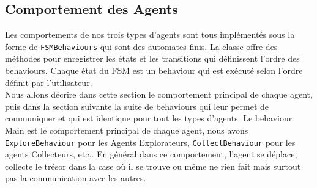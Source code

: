 \documentclass[10pt]{article}
\begin{document}
	\subsection{Comportement des Agents}
	Les comportements de nos trois types d'agents sont tous implémentés sous la forme de \texttt{FSMBehaviours} qui sont des automates finis. La classe offre des méthodes pour enregistrer les états et les transitions qui définissent l'ordre des behaviours.	Chaque état du FSM est un behaviour qui est exécuté selon l'ordre définit par l'utilisateur.\\
	Nous allons décrire dans cette section le comportement principal de chaque agent, puis dans la section suivante la suite de behaviours qui leur permet de communiquer et qui est identique pour tout les types d'agents. Le behaviour Main est le comportement principal de chaque agent, nous avons \texttt{ExploreBehaviour} pour les Agents Explorateurs, \texttt{CollectBehaviour} pour les agents Collecteurs, etc.. En général dans ce comportement, l'agent se déplace, collecte le trésor dans la case où il se trouve ou même ne rien fait mais surtout pas la communication avec les autres.
\end{document}
